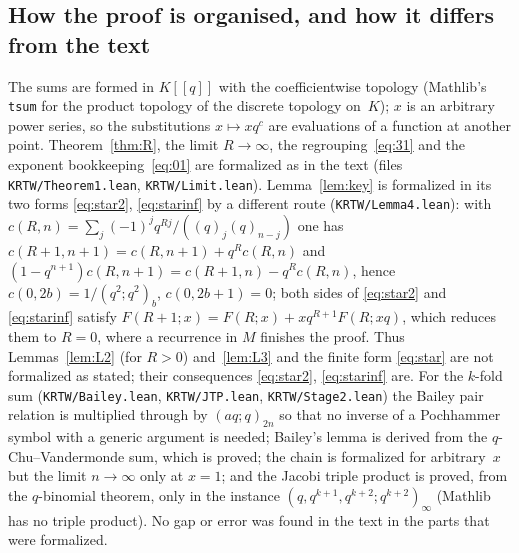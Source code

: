 \documentclass[11pt]{amsart}
\theoremstyle{definition}
\numberwithin{equation}{section}
\newcommand{\fpath}[1]{\nolinkurl{#1}}
\begin{document}
\subsection{How the proof is organised, and how it differs from the text}
The sums are formed in $K[[q]]$ with the coefficientwise topology (Mathlib's \texttt{tsum} for the
product topology of the discrete topology on~$K$); $x$ is an arbitrary power series, so the
substitutions $x\mapsto xq^c$ are evaluations of a function at another point. Theorem~\ref{thm:R}, the
limit $R\to\infty$, the regrouping~\eqref{eq:31} and the exponent bookkeeping~\eqref{eq:01} are
formalized as in the text (files \fpath{KRTW/Theorem1.lean}, \fpath{KRTW/Limit.lean}). Lemma~\ref{lem:key}
is formalized in its two forms \eqref{eq:star2}, \eqref{eq:starinf} by a different route
(\fpath{KRTW/Lemma4.lean}): with $c(R,n)=\sum_j(-1)^jq^{Rj}/((q)_j(q)_{n-j})$ one has
$c(R+1,n+1)=c(R,n+1)+q^Rc(R,n)$ and $(1-q^{n+1})c(R,n+1)=c(R+1,n)-q^Rc(R,n)$, hence $c(0,2b)=1/(q^2;q^2)_b$,
$c(0,2b+1)=0$; both sides of \eqref{eq:star2} and \eqref{eq:starinf} satisfy
$F(R+1;x)=F(R;x)+xq^{R+1}F(R;xq)$, which reduces them to $R=0$, where a recurrence in $M$ finishes the
proof. Thus Lemmas~\ref{lem:L2} (for $R>0$) and~\ref{lem:L3} and the finite form \eqref{eq:star} are not
formalized as stated; their consequences \eqref{eq:star2}, \eqref{eq:starinf} are. For the $k$-fold sum
(\fpath{KRTW/Bailey.lean}, \fpath{KRTW/JTP.lean}, \fpath{KRTW/Stage2.lean}) the Bailey pair relation is
multiplied through by $(aq;q)_{2n}$ so that no inverse of a Pochhammer symbol with a generic argument is
needed; Bailey's lemma is derived from the $q$-Chu--Vandermonde sum, which is proved; the chain is
formalized for arbitrary~$x$ but the limit $n\to\infty$ only at $x=1$; and the Jacobi triple product is
proved, from the $q$-binomial theorem, only in the instance $(q,q^{k+1},q^{k+2};q^{k+2})_\infty$ (Mathlib
has no triple product). No gap or error was found in the text in the parts that were formalized.
\end{document}
